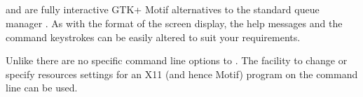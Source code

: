 \subsection{\XbtqName{} \XmbtqName}

\begin{expara}

\XbtqName{}

\XmbtqName{}

\end{expara}

\PrXbtq{} and \PrXmbtq{} are fully interactive GTK+ Motif alternatives to
the standard queue manager \PrBtq{}. As with
\PrBtq{} the format of the screen display, the help
messages and the command keystrokes can be easily altered to suit your
requirements.

Unlike \PrBtq{} there are no specific command line
options to \PrXmbtq{}. The facility to change or
specify resources settings for an X11 (and hence Motif) program on the
command line can be used.

